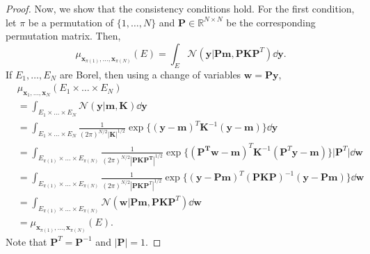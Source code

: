 \begin{proof}
    Now, we show that the consistency conditions hold.
    For the first condition, let $\pi$ be a permutation of $\{ 1, \dots, N \}$ and $\mathbf{P} \in \mathbb{R}^{N \times N}$ be the corresponding permutation matrix.
    Then,
    \begin{equation*}
        \mu_{\mathbf{x}_{\pi(1)}, \dots, \mathbf{x}_{\pi(N)}}(E) =
        \int_{E} \mathcal{N}(\mathbf{y} | \mathbf{Pm}, \mathbf{P} \mathbf{K} \mathbf{P}^{T}) \dd \mathbf{y}.
    \end{equation*}
    If $E_1, \dots, E_N$ are Borel, then using a change of variables $\mathbf{w} = \mathbf{Py}$,
    \begin{align*}
        & \mu_{\mathbf{x}_1, \dots, \mathbf{x}_N}(E_1 \times \dots \times E_N) \\
        & = \int_{E_1 \times \dots \times E_N} \mathcal{N}(\mathbf{y} | \mathbf{m}, \mathbf{K}) \dd \mathbf{y} \\
        & = \int_{E_1 \times \dots \times E_N}
        \frac{ 1 }{ (2 \pi)^{N/2} \lvert \mathbf{K} \rvert^{1/2} }
        \exp \{ (\mathbf{y} - \mathbf{m})^{T} \mathbf{K}^{-1} (\mathbf{y} - \mathbf{m}) \}
        \dd \mathbf{y} \\
        & = \int_{E_{\pi(1)} \times \dots \times E_{\pi(N)}}
        \frac{ 1 }{ (2 \pi)^{N/2} \left\lvert \mathbf{PKP^T} \right\rvert^{1/2} }
        \exp \{ \left(\mathbf{P^Tw} - \mathbf{m}\right)^{T} \mathbf{K}^{-1} (\mathbf{P}^{T}\mathbf{y} - \mathbf{m}) \}
        \lvert \mathbf{P}^{T} \rvert \dd \mathbf{w} \\
        & = \int_{E_{\pi(1)} \times \dots \times E_{\pi(N)}}
        \frac{ 1 }{ (2 \pi)^{N/2} \left\lvert \mathbf{PKP}^T \right\rvert^{1/2} }
        \exp \{ (\mathbf{y} - \mathbf{Pm})^{T} (\mathbf{P}\mathbf{K} \mathbf{P})^{-1} (\mathbf{y} - \mathbf{P}\mathbf{m}) \} \dd \mathbf{w} \\
        & = \int_{E_{\pi(1)} \times \dots \times E_{\pi(N)}}
        \mathcal{N}(\mathbf{w} | \mathbf{Pm}, \mathbf{P} \mathbf{K} \mathbf{P}^{T}) \dd \mathbf{w} \\
        & = \mu_{\mathbf{x}_{\pi(1)}, \dots, \mathbf{x}_{\pi(N)}}(E).
    \end{align*}
    Note that $\mathbf{P}^{T} = \mathbf{P}^{-1}$ and $\lvert \mathbf{P} \rvert = 1$.


\end{proof}

